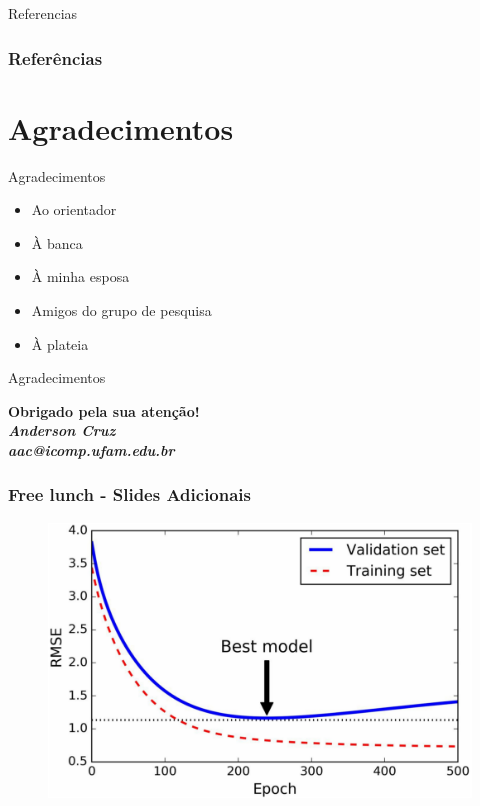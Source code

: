 \documentclass{beamer}
\begin{document}
\begin{frame}{Referencias}
\frametitle{Referências}
    \tiny{ }
    
\end{frame}


\section{Agradecimentos}
\begin{frame}{Agradecimentos}
\begin{itemize}
 \item Ao orientador
\item À banca
\item À minha esposa
\item Amigos do grupo de pesquisa
\item À plateia
\end{itemize}

\end{frame}

  \begin{frame}{Agradecimentos}
  \begin{center}
 
  \textcolor{VerdeUFAM}{\Large \textbf{Obrigado pela sua atenção!}} \\
  \vspace*{20px}
  \textit{\textbf{Anderson Cruz}} \\
  \textit{\textbf{aac@icomp.ufam.edu.br}}
 
  \end{center}
  \end{frame}

 
\begin{frame}
\frametitle{Free lunch - Slides Adicionais}
\begin{figure}
\centering
\includegraphics[scale=0.25]{figuras/best-model.png}
\label{fig:arquitetura4}
\end{figure}
\end{frame}  
\end{document}
